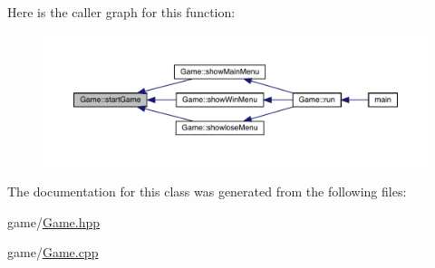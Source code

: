 Here is the caller graph for this function\+:
\nopagebreak
\begin{figure}[H]
\begin{center}
\leavevmode
\includegraphics[width=350pt]{class_game_afcca871ec55fbe14b2179bcb914d5421_icgraph}
\end{center}
\end{figure}


The documentation for this class was generated from the following files\+:\begin{DoxyCompactItemize}
\item 
game/\mbox{\hyperlink{_game_8hpp}{Game.\+hpp}}\item 
game/\mbox{\hyperlink{_game_8cpp}{Game.\+cpp}}\end{DoxyCompactItemize}

